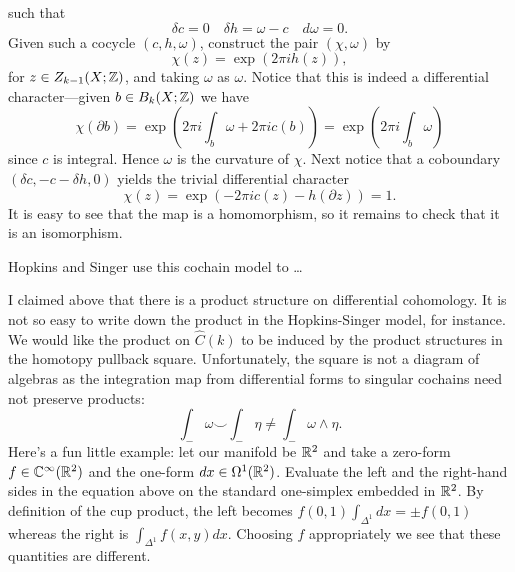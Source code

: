 \documentclass{amsart}
\begin{document}
such that
\begin{equation*}
    \delta c = 0 \quad \delta h = \omega - c \quad d\omega = 0.
\end{equation*}
Given such a cocycle $(c,h,\omega)$, construct the pair $(\chi,\omega)$ by
\begin{equation*}
    \chi(z) = \exp\left( 2\pi ih(z) \right),
\end{equation*}
for $z\in Z_{k-1}(X;\mathbb{Z})$, and taking $\omega$ as $\omega$. Notice that this
is indeed a differential character---given $b\in B_k(X;\mathbb{Z})$ we have
\begin{equation*}
    \chi(\partial b) = \exp\left(2\pi i\int_b\omega  + 2\pi i c(b)\right) = \exp\left( 2\pi i\int_b\omega \right)
\end{equation*}
since $c$ is integral. Hence $\omega$ is the curvature of $\chi$. Next
notice that a coboundary $(\delta c, -c-\delta h,0)$ yields the trivial differential
character
\begin{equation*}
    \chi(z)=\exp(-2\pi ic(z)-h(\partial z)) = 1.
\end{equation*}
It is easy to see that the map is a homomorphism, so it remains to check
that it is an isomorphism. 

Hopkins and Singer use this cochain model to \ldots {}


I claimed above that there is a product structure on differential cohomology.
It is not so easy to write down the product in the Hopkins-Singer model, for
instance. We would like the product on $\hat C(k)$ to be induced by the product
structures in the homotopy pullback square. Unfortunately, the square is not
a diagram of algebras as the integration map from differential forms to singular
cochains need not preserve products:
\begin{equation*}
    \int_-\omega\smile \int_-\eta \neq \int_-\omega\wedge\eta.
\end{equation*}
Here's a fun little example: let our manifold be $\mathbb{R}^2$ and take a zero-form
$f\in\mathbb{C}^\infty(\mathbb{R}^2)$ and the one-form $dx\in\Omega^1(\mathbb{R}^2)$. Evaluate
the left and the right-hand sides in the equation above on the standard
one-simplex embedded in $\mathbb{R}^2$.
By definition of the cup product, the left becomes
$f(0,1)\int_{\Delta^1}dx=\pm f(0,1)$ whereas the right is $\int_{\Delta^1}f(x,y)dx$.
Choosing $f$ appropriately we see that these quantities are different.
\end{document}
